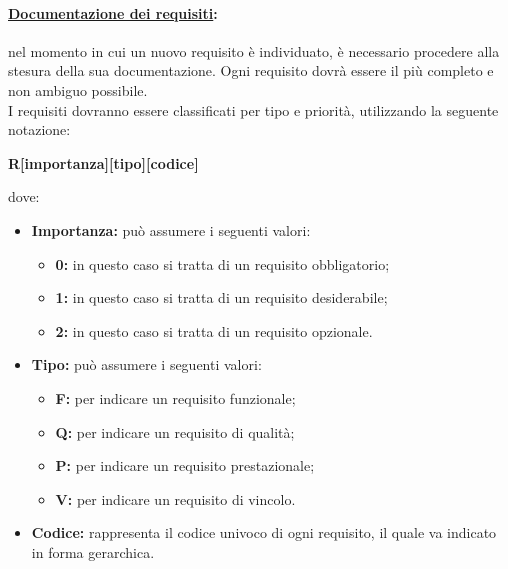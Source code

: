 \paragraph{\underline{Documentazione dei requisiti}:} nel momento in cui un nuovo requisito è individuato, è necessario procedere alla stesura della sua documentazione. Ogni requisito dovrà essere il più completo e non ambiguo possibile.\\
I requisiti dovranno essere classificati per tipo e priorità, utilizzando la seguente notazione:
\begin{center}
\textbf{R[importanza][tipo][codice]}
\end{center}
dove:
\begin{itemize}
\item\textbf{Importanza:} può assumere i seguenti valori:
\begin{itemize}
\item\textbf{0:} in questo caso si tratta di un requisito obbligatorio;
\item\textbf{1:} in questo caso si tratta di un requisito desiderabile;
\item\textbf{2:} in questo caso si tratta di un requisito opzionale.
\end{itemize}
\item\textbf{Tipo:} può assumere i seguenti valori:
\begin{itemize}
\item\textbf{F:} per indicare un requisito funzionale;
\item\textbf{Q:} per indicare un requisito di qualità;
\item\textbf{P:} per indicare un requisito prestazionale;
\item\textbf{V:} per indicare un requisito di vincolo.
\end{itemize}
\item\textbf{Codice:} rappresenta il codice univoco di ogni requisito, il quale va indicato in forma gerarchica.
\end{itemize}

